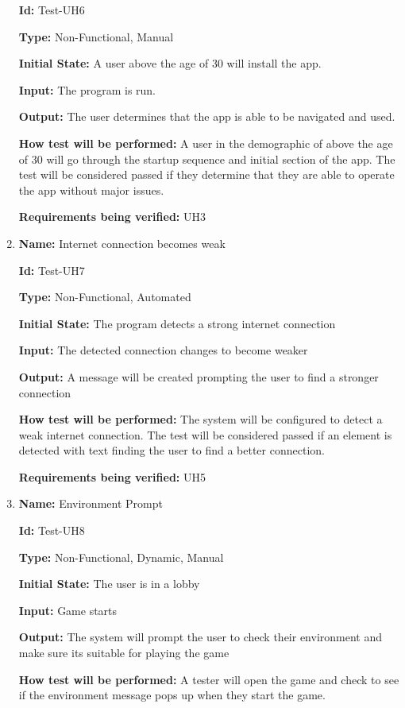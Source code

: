 \documentclass[12pt, titlepage]{article}
\begin{document}
\begin{enumerate}
\textbf{Id:} Test-UH6

\textbf{Type:} Non-Functional, Manual
					
\textbf{Initial State:} A user above the age of 30 will install the app.
					
\textbf{Input:} The program is run.
					
\textbf{Output:} The user determines that the app is able to be navigated and used.
					
\textbf{How test will be performed:} A user in the demographic of above the age of 30 will go through the startup sequence and initial section of the app. The test will be considered passed if they determine that they are able to operate the app without major issues. 

\textbf{Requirements being verified:} UH3

\item{\textbf{Name:} Internet connection becomes weak}

\textbf{Id:} Test-UH7

\textbf{Type:} Non-Functional, Automated
					
\textbf{Initial State:} The program detects a strong internet connection
					
\textbf{Input:} The detected connection changes to become weaker
					
\textbf{Output:} A message will be created prompting the user to find a stronger connection
					
\textbf{How test will be performed:} The system will be configured to detect a weak internet connection. The test will be considered passed if an element is detected with text finding the user to find a better connection.

\textbf{Requirements being verified:} UH5

\item{\textbf{Name:} Environment Prompt }

\textbf{Id:} Test-UH8

\textbf{Type:} Non-Functional, Dynamic, Manual
					
\textbf{Initial State:} The user is in a lobby
					
\textbf{Input:} Game starts
					
\textbf{Output:} The system will prompt the user to check their environment and make sure its suitable for playing the game
					
\textbf{How test will be performed:} A tester will open the game and check to see if the environment message pops up when they start the game. 


\end{enumerate}
\end{document}
